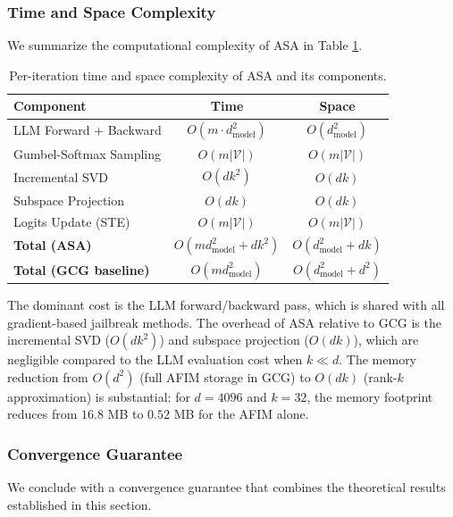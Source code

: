 ﻿\documentclass[lettersize,journal]{IEEEtran}
\begin{document}
\subsubsection{Time and Space Complexity}
\label{sec:alg_complexity}

We summarize the computational complexity of ASA in Table \ref{tab:complexity}.

\begin{table}[t]
\centering
\caption{Per-iteration time and space complexity of ASA and its components.}
\label{tab:complexity}
\begin{tabular}{lcc}
\toprule
\textbf{Component} & \textbf{Time} & \textbf{Space} \\
\midrule
LLM Forward + Backward & $O(m \cdot d_{\text{model}}^2)$ & $O(d_{\text{model}}^2)$ \\
Gumbel-Softmax Sampling & $O(m |\mathcal{V}|)$ & $O(m |\mathcal{V}|)$ \\
Incremental SVD & $O(d k^2)$ & $O(d k)$ \\
Subspace Projection & $O(d k)$ & $O(d k)$ \\
Logits Update (STE) & $O(m |\mathcal{V}|)$ & $O(m |\mathcal{V}|)$ \\
\midrule
\textbf{Total (ASA)} & $O(m d_{\text{model}}^2 + d k^2)$ & $O(d_{\text{model}}^2 + d k)$ \\
\textbf{Total (GCG baseline)} & $O(m d_{\text{model}}^2)$ & $O(d_{\text{model}}^2 + d^2)$ \\
\bottomrule
\end{tabular}
\end{table}

The dominant cost is the LLM forward/backward pass, which is shared with all gradient-based jailbreak methods. The overhead of ASA relative to GCG is the incremental SVD ($O(dk^2)$) and subspace projection ($O(dk)$), which are negligible compared to the LLM evaluation cost when $k \ll d$. The memory reduction from $O(d^2)$ (full AFIM storage in GCG) to $O(dk)$ (rank-$k$ approximation) is substantial: for $d = 4096$ and $k = 32$, the memory footprint reduces from $16.8$ MB to $0.52$ MB for the AFIM alone.

\subsubsection{Convergence Guarantee}
\label{sec:alg_convergence}

We conclude with a convergence guarantee that combines the theoretical results established in this section.
\end{document}
